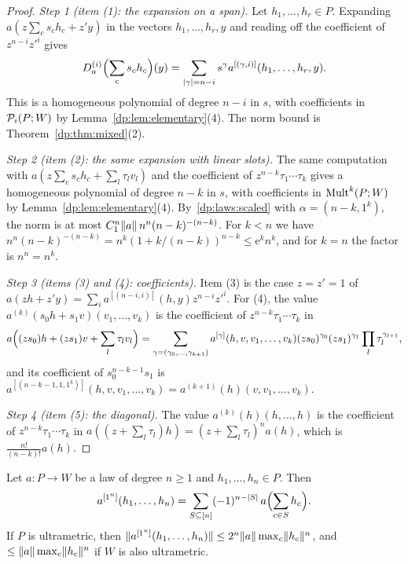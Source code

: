 \begin{proof}
\emph{Step 1 (item (1): the expansion on a span).} Let $h_1,\dots,h_r\in P$. Expanding $a(z\sum_cs_ch_c+z'y)$ in the vectors $h_1,\dots,h_r,y$ and reading off the coefficient of $z^{n-i}z'^i$ gives
\begin{equation}\label{dp:laws:hasse-expansion}
 D^{(i)}_a\Bigl(\sum_cs_ch_c\Bigr)(y)=\sum_{\lvert \gamma\rvert=n-i}s^\gamma a^{[(\gamma,i)]}(h_1,\dots,h_r,y).
\end{equation}
This is a homogeneous polynomial of degree $n-i$ in $s$, with coefficients in $\mathcal P_i(P;W)$ by Lemma~\ref{dp:lem:elementary}(4). The norm bound is Theorem~\ref{dp:thm:mixed}(2).

\emph{Step 2 (item (2): the same expansion with linear slots).} The same computation with $a(z\sum_cs_ch_c+\sum_l\tau_lv_l)$ and the coefficient of $z^{n-k}\tau_1\cdots\tau_k$ gives a homogeneous polynomial of degree $n-k$ in $s$, with coefficients in $\operatorname{Mult}^k(P;W)$ by Lemma~\ref{dp:lem:elementary}(4). By~\eqref{dp:laws:scaled} with $\alpha=(n-k,1^k)$, the norm is at most $C_1^n\lVert a\rVert\,n^n(n-k)^{-(n-k)}$. For $k<n$ we have $n^n(n-k)^{-(n-k)}=n^k(1+k/(n-k))^{n-k}\le\mathrm e^kn^k$, and for $k=n$ the factor is $n^n=n^k$.

\emph{Step 3 (items (3) and (4): coefficients).} Item (3) is the case $z=z'=1$ of $a(z h+z'y)=\sum_ia^{[(n-i,i)]}(h,y)z^{n-i}z'^i$. For (4), the value $a^{(k)}(s_0h+s_1v)(v_1,\dots,v_k)$ is the coefficient of $z^{n-k}\tau_1\cdots\tau_k$ in
\[
 a\Bigl((zs_0)h+(zs_1)v+\sum_l\tau_lv_l\Bigr)=\sum_{\gamma=(\gamma_0,\dots,\gamma_{k+1})}a^{[\gamma]}(h,v,v_1,\dots,v_k)(zs_0)^{\gamma_0}(zs_1)^{\gamma_1}\prod_l\tau_l^{\gamma_{l+1}},
\]
and its coefficient of $s_0^{n-k-1}s_1$ is $a^{[(n-k-1,1,1^k)]}(h,v,v_1,\dots,v_k)=a^{(k+1)}(h)(v,v_1,\dots,v_k)$.

\emph{Step 4 (item (5): the diagonal).} The value $a^{(k)}(h)(h,\dots,h)$ is the coefficient of $z^{n-k}\tau_1\cdots\tau_k$ in $a((z+\sum_l\tau_l)h)=(z+\sum_l\tau_l)^na(h)$, which is $\frac{n!}{(n-k)!}a(h)$.
\end{proof}

\begin{lemma}[polarization]\label{dp:lem:polarization}
Let $a\colon P\to W$ be a law of degree $n\ge1$ and $h_1,\dots,h_n\in P$. Then
\begin{equation}\label{dp:laws:polarization}
 a^{[1^n]}(h_1,\dots,h_n)=\sum_{S\subseteq[n]}(-1)^{n-\lvert S\rvert}\,a\Bigl(\sum_{c\in S}h_c\Bigr).
\end{equation}
If $P$ is ultrametric, then $\lVert a^{[1^n]}(h_1,\dots,h_n)\rVert\le2^n\lVert a\rVert\max_c\lVert h_c\rVert^n$, and $\le\lVert a\rVert\max_c\lVert h_c\rVert^n$ if $W$ is also ultrametric.
\end{lemma}

